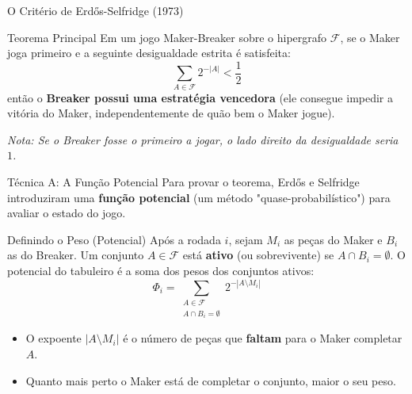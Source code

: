 \documentclass[11pt, aspectratio=169]{beamer}
\begin{document}
\begin{frame}{O Critério de Erdős-Selfridge (1973)}
    \begin{block}{Teorema Principal}
        Em um jogo Maker-Breaker sobre o hipergrafo $\mathcal{F}$, se o Maker joga primeiro e a seguinte desigualdade estrita é satisfeita:
        \begin{equation*}
            \sum_{A \in \mathcal{F}} 2^{-|A|} < \frac{1}{2}
        \end{equation*}
        então o \textbf{Breaker possui uma estratégia vencedora} (ele consegue impedir a vitória do Maker, independentemente de quão bem o Maker jogue).
    \end{block}
    \vspace{0.5cm}
    \textit{Nota: Se o Breaker fosse o primeiro a jogar, o lado direito da desigualdade seria $1$.}
\end{frame}

\begin{frame}{Técnica A: A Função Potencial}
    Para provar o teorema, Erdős e Selfridge introduziram uma \textbf{função potencial} (um método "quase-probabilístico") para avaliar o estado do jogo.
    
    \begin{block}{Definindo o Peso (Potencial)}
        Após a rodada $i$, sejam $M_i$ as peças do Maker e $B_i$ as do Breaker.
        Um conjunto $A \in \mathcal{F}$ está \textbf{ativo} (ou sobrevivente) se $A \cap B_i = \emptyset$.
        O potencial do tabuleiro é a soma dos pesos dos conjuntos ativos:
        \begin{equation*}
            \Phi_i = \sum_{\substack{A \in \mathcal{F} \\ A \cap B_i = \emptyset}} 2^{-|A \setminus M_i|}
        \end{equation*}
    \end{block}
    
    \begin{itemize}
        \item O expoente $|A \setminus M_i|$ é o número de peças que \textbf{faltam} para o Maker completar $A$.
        \item Quanto mais perto o Maker está de completar o conjunto, maior o seu peso.
    \end{itemize}
\end{frame}
\end{document}

